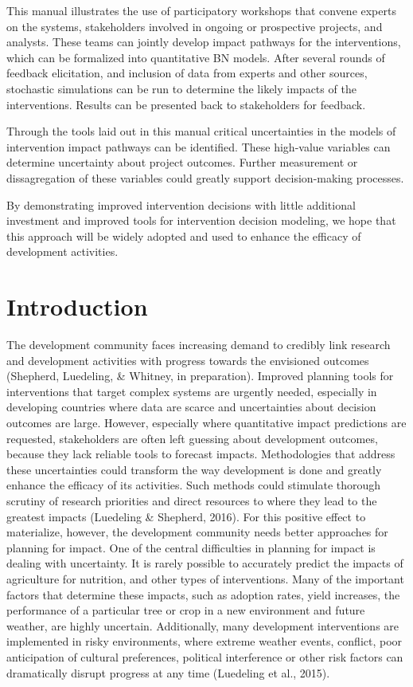 \documentclass[
]{article}
\begin{document}
This manual illustrates the use of participatory workshops that convene
experts on the systems, stakeholders involved in ongoing or prospective
projects, and analysts. These teams can jointly develop impact pathways
for the interventions, which can be formalized into quantitative BN
models. After several rounds of feedback elicitation, and inclusion of
data from experts and other sources, stochastic simulations can be run
to determine the likely impacts of the interventions. Results can be
presented back to stakeholders for feedback.

Through the tools laid out in this manual critical uncertainties in the
models of intervention impact pathways can be identified. These
high-value variables can determine uncertainty about project outcomes.
Further measurement or dissagregation of these variables could greatly
support decision-making processes.

By demonstrating improved intervention decisions with little additional
investment and improved tools for intervention decision modeling, we
hope that this approach will be widely adopted and used to enhance the
efficacy of development activities.

\hypertarget{introduction}{%
\section{Introduction}\label{introduction}}

The development community faces increasing demand to credibly link
research and development activities with progress towards the envisioned
outcomes (Shepherd, Luedeling, \& Whitney, in preparation). Improved
planning tools for interventions that target complex systems are
urgently needed, especially in developing countries where data are
scarce and uncertainties about decision outcomes are large. However,
especially where quantitative impact predictions are requested,
stakeholders are often left guessing about development outcomes, because
they lack reliable tools to forecast impacts. Methodologies that address
these uncertainties could transform the way development is done and
greatly enhance the efficacy of its activities. Such methods could
stimulate thorough scrutiny of research priorities and direct resources
to where they lead to the greatest impacts (Luedeling \& Shepherd,
2016). For this positive effect to materialize, however, the development
community needs better approaches for planning for impact. One of the
central difficulties in planning for impact is dealing with uncertainty.
It is rarely possible to accurately predict the impacts of agriculture
for nutrition, and other types of interventions. Many of the important
factors that determine these impacts, such as adoption rates, yield
increases, the performance of a particular tree or crop in a new
environment and future weather, are highly uncertain. Additionally, many
development interventions are implemented in risky environments, where
extreme weather events, conflict, poor anticipation of cultural
preferences, political interference or other risk factors can
dramatically disrupt progress at any time (Luedeling et al., 2015).
\end{document}
